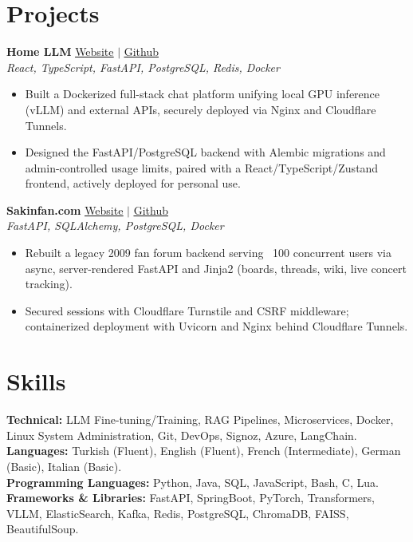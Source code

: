\documentclass[paper=a4,fontsize=10pt]{scrartcl}
\begin{document}
\section*{Projects}
\textbf{Home LLM} \hfill \href{https://llm.yigittuncer.net}{\underline{Website}} $|$ \href{https://github.com/yigittuncer07/home-llm}{\underline{Github}}\\
\textit{React, TypeScript, FastAPI, PostgreSQL, Redis, Docker}
\begin{itemize}[noitemsep, topsep=2pt, parsep=0pt, partopsep=0pt, leftmargin=*]
    \item Built a Dockerized full-stack chat platform unifying local GPU inference (vLLM) and external APIs, securely deployed via Nginx and Cloudflare Tunnels.
    \item Designed the FastAPI/PostgreSQL backend with Alembic migrations and admin-controlled usage limits, paired with a React/TypeScript/Zustand frontend, actively deployed for personal use.
\end{itemize}

\textbf{Sakinfan.com} \hfill \href{https://sakinfan.com}{\underline{Website}} $|$ \href{https://github.com/yigittuncer07/sakinfan.com}{\underline{Github}}\\
\textit{FastAPI, SQLAlchemy, PostgreSQL, Docker}
\begin{itemize}[noitemsep, topsep=2pt, parsep=0pt, partopsep=0pt, leftmargin=*]
    \item Rebuilt a legacy 2009 fan forum backend serving ~100 concurrent users via async, server-rendered FastAPI and Jinja2 (boards, threads, wiki, live concert tracking).
    \item Secured sessions with Cloudflare Turnstile and CSRF middleware; containerized deployment with Uvicorn and Nginx behind Cloudflare Tunnels.
\end{itemize}

\section*{Skills}
\textbf{Technical:} LLM Fine-tuning/Training, RAG Pipelines, Microservices, Docker, Linux System Administration, Git, DevOps, Signoz, Azure, LangChain.\\
\textbf{Languages:} Turkish (Fluent), English (Fluent), French (Intermediate), German (Basic), Italian (Basic).\\
\textbf{Programming Languages:} Python, Java, SQL, JavaScript, Bash, C, Lua.\\
\textbf{Frameworks \& Libraries:} FastAPI, SpringBoot, PyTorch, Transformers, VLLM, ElasticSearch, Kafka, Redis, PostgreSQL, ChromaDB, FAISS, BeautifulSoup.
\end{document}
